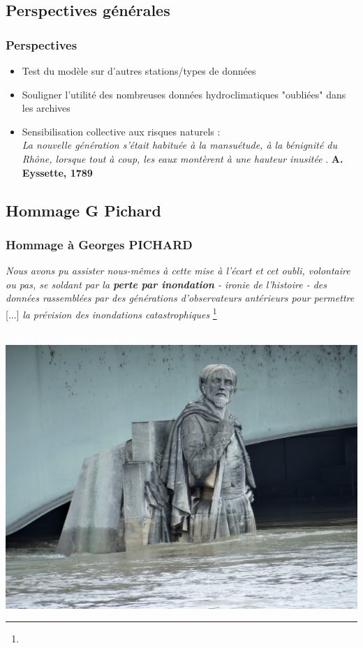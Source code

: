 \documentclass[compress,9pt]{beamer}
\renewcommand{\footfullcite}[1]{\footnote[frame]{\fullcite{#1}}}
\begin{document}
	\subsection{Perspectives générales}
	\begin{frame}
		\frametitle{Perspectives}
		\vfill
		\begin{itemize}
			\item<1->[$\vartriangleright$] Test du modèle sur d'autres stations/types de données
			\vfill
			\item<2->[$\vartriangleright$] Souligner l'utilité des nombreuses données hydroclimatiques "oubliées" dans les archives
			\vfill
			\item<3->[$\vartriangleright$] Sensibilisation collective aux risques naturels : \\ \og \textit{La nouvelle génération s'était habituée à la mansuétude, à la bénignité du Rhône, lorsque tout à coup, les eaux montèrent à une hauteur inusitée} \fg{}. \textbf{A. Eyssette, 1789}
				\end{itemize}
	\end{frame}
	
	\subsection{Hommage G Pichard}
	\begin{frame}
		\frametitle{Hommage à Georges PICHARD}
		\centering
		\og \textit{Nous avons pu assister nous-mêmes à cette mise à l'écart et cet oubli, volontaire ou pas, se soldant par la \textbf{perte par inondation} - ironie de l'histoire - des données rassemblées par des générations d'observateurs antérieurs pour permettre} [...] \textit{la prévision des inondations catastrophiques} \fg{} \footfullcite{pichard_sept_2014}
	\end{frame}
	
	{
    \begin{frame}
        \begin{center}
        	\vfill
        	\textcolor{white}{\Huge \textbf{Merci pour votre attention !}}\\
		\vfill
		\includegraphics[width = .6\textwidth]{./Figures/Zouave.jpg}
        \end{center}
    \end{frame}
    }	
    
\end{document}
